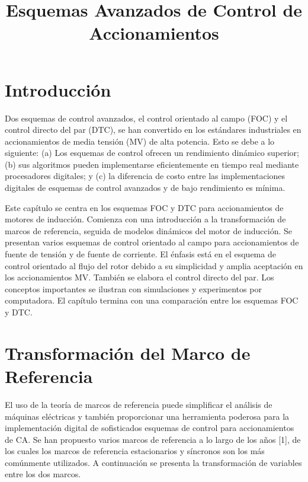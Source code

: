 \documentclass[letterpaper,12pt]{article} %
\title{Esquemas Avanzados de Control de Accionamientos}
\author{}
\date{}
\begin{document}
\maketitle
\thispagestyle{fancy} %

\section{Introducción}

Dos esquemas de control avanzados, el control orientado al campo (FOC) y el control directo del par (DTC), se han convertido en los estándares industriales en accionamientos de media tensión (MV) de alta potencia. Esto se debe a lo siguiente: (a) Los esquemas de control ofrecen un rendimiento dinámico superior; (b) sus algoritmos pueden implementarse eficientemente en tiempo real mediante procesadores digitales; y (c) la diferencia de costo entre las implementaciones digitales de esquemas de control avanzados y de bajo rendimiento es mínima.

Este capítulo se centra en los esquemas FOC y DTC para accionamientos de motores de inducción. Comienza con una introducción a la transformación de marcos de referencia, seguida de modelos dinámicos del motor de inducción. Se presentan varios esquemas de control orientado al campo para accionamientos de fuente de tensión y de fuente de corriente. El énfasis está en el esquema de control orientado al flujo del rotor debido a su simplicidad y amplia aceptación en los accionamientos MV. También se elabora el control directo del par. Los conceptos importantes se ilustran con simulaciones y experimentos por computadora. El capítulo termina con una comparación entre los esquemas FOC y DTC.

\section{Transformación del Marco de Referencia}

El uso de la teoría de marcos de referencia puede simplificar el análisis de máquinas eléctricas y también proporcionar una herramienta poderosa para la implementación digital de sofisticados esquemas de control para accionamientos de CA. Se han propuesto varios marcos de referencia a lo largo de los años [1], de los cuales los marcos de referencia estacionarios y síncronos son los más comúnmente utilizados. A continuación se presenta la transformación de variables entre los dos marcos.
\end{document}
